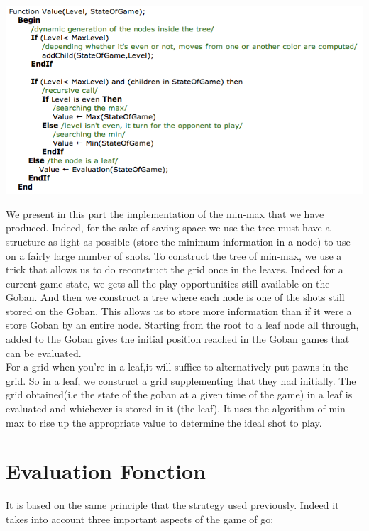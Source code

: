 \documentclass{report}
\begin{document}
\begin{center}
\includegraphics[scale=0.60]{images/MinMax.png}
\end{center}

\vspace{1cm}

We present in this part the implementation of the min-max that we have produced.
Indeed, for the sake of saving space we use the tree must have a
structure as light as possible (store the minimum information in a node) to
use on a fairly large number of shots.
To construct the tree of min-max, we use a trick that allows us to do
reconstruct the grid once in the leaves. Indeed for a current game state, we
gets all the play opportunities still available on the Goban. And then we
construct a tree where each node is one of the shots still stored on the Goban.
This allows us to store more information than if it were a store
Goban by an entire node.
Starting from the root to a leaf node all through, added to the Goban
gives the initial position reached in the Goban games that can be evaluated.\\

For a grid when you're in a leaf,it will suffice to
alternatively put pawns in the grid. So in a leaf, we construct a grid
supplementing that they had initially. The grid obtained(i.e the state of the goban at a given time of the game) in a leaf is evaluated and
whichever is stored in it (the leaf). It uses the algorithm of min-max to rise
up the appropriate value to determine the ideal shot to play.\\

\section*{Evaluation Fonction }
It is based on the same principle that the strategy used previously. Indeed it
takes into account three important aspects of the game of go:\\
\end{document}
